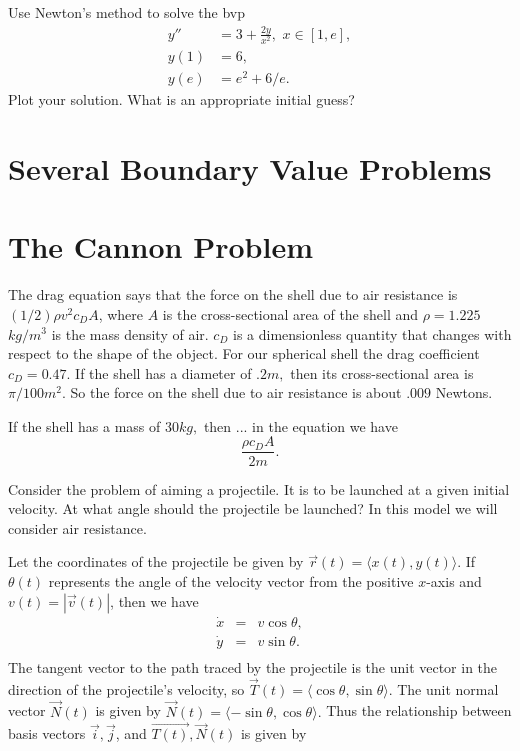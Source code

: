 \begin{problem}
Use Newton's method to solve the bvp
\begin{equation*}
\begin{split}
y'' &= 3 + \frac{2y}{x^2}, \,\, x \in [1,e],\\
y(1) &= 6, \\
y(e) &= e^2 + 6/e.
\end{split}
\end{equation*}
Plot your solution. What is an appropriate initial guess? 
\end{problem}


\section{Several Boundary Value Problems}

\section*{The Cannon Problem}

The drag equation says that the force on the shell due to air resistance is $(1/2)\rho v^2 c_D A$, where $A$ is the cross-sectional area of the shell and $\rho= 1.225$ $kg/m^3$ is the mass density of air. $c_D$ is a dimensionless quantity that changes with respect to the shape of the object. For our spherical shell the drag coefficient $c_D = 0.47.$ If the shell has a diameter of $.2 m,$ then its cross-sectional area is $\pi/100 m^2$. So the force on the shell due to air 
resistance is about $.009$ Newtons.


If the shell has a mass of $30 kg,$ then ... in the equation we have
\[\frac{\rho c_D A}{2 m}.\]

Consider the problem of aiming a projectile. It is to be launched at a given initial velocity. At what angle should the projectile be launched? In this model we will consider air resistance. 

Let the coordinates of the projectile be given by $\vec{r}(t) = \langle x(t), y(t) \rangle.$ If $\theta(t)$ represents the angle of the velocity vector from the positive $x$-axis and $v(t) = |\vec{v}(t) |$, then we have 
\begin{eqnarray*}
\dot{x} &=& v\cos{\theta},\\
\dot{y} &=& v\sin{\theta}.\\
\end{eqnarray*}
The tangent vector to the path traced by the projectile is the unit vector in the direction of the projectile's velocity, so $\vec{T}(t) = \langle \cos{\theta}, \sin{\theta} \rangle.$ The unit normal vector $\vec{N} (t)$ is given by $\vec{N} (t)= \langle -\sin{\theta}, \cos{\theta} \rangle.$ Thus the relationship between basis vectors $\vec{i}, \vec{j}$, and $\vec{T(t)}, \vec{N}(t)$ is given by 

